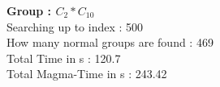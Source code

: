 \textbf{Group : $C_2*C_{10}$}\\
Searching up to index : 500\\
How many normal groups are found : 469\\
Total Time in s : 120.7\\
Total Magma-Time in s : 243.42\\
